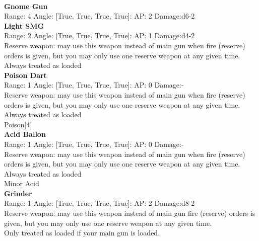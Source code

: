 \ \\
{\bf Gnome Gun } \\



Range: 4  Angle: [True, True, True, True]: AP: 2 Damage:d6-2 \\




{\bf Light SMG } \\



Range: 2  Angle: [True, True, True, True]: AP: 1 Damage:d4-2 \\
Reserve weapon: may use this weapon instead of main gun when fire (reserve) orders is given, but you may only use one reserve weapon at any given time.\\ 
Always treated as loaded\\ 




{\bf Poison Dart } \\



Range: 1  Angle: [True, True, True, True]: AP: 0 Damage:- \\
Reserve weapon: may use this weapon instead of main gun when fire (reserve) orders is given, but you may only use one reserve weapon at any given time.\\ 
Always treated as loaded\\ 
Poison[4]\\ 




{\bf Acid Ballon } \\



Range: 1  Angle: [True, True, True, True]: AP: 0 Damage:- \\
Reserve weapon: may use this weapon instead of main gun when fire (reserve) orders is given, but you may only use one reserve weapon at any given time.\\ 
Always treated as loaded\\ 
Minor Acid\\ 




{\bf Grinder } \\



Range: 1  Angle: [True, True, True, True]: AP: 2 Damage:d8-2 \\
Reserve weapon: may use this weapon instead of main gun fire (reserve) orders is given, but you may only use one reserve weapon at any given time.\\ 
Only treated as loaded if your main gun is loaded.\\ 




